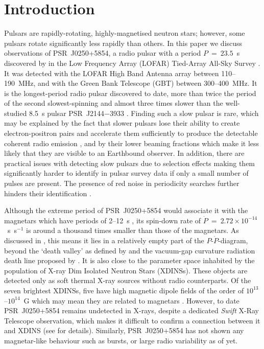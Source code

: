 \section{Introduction}
\label{sec: J0250 - introduction}
Pulsars are rapidly-rotating, highly-magnetised neutron stars; however, some pulsars rotate significantly less rapidly than others. In this paper we discuss observations of PSR~J0250+5854, a radio pulsar with a period $P~=~23.5$~s discovered by \citet{TBC+2018} in the Low Frequency Array (LOFAR) Tied-Array All-Sky Survey \citep[LOTAAS;][]{SCB+2019}. It was detected with the LOFAR High Band Antenna array between 110--190~MHz, and with the Green Bank Telescope (GBT) between 300--400~MHz. It is the longest-period radio pulsar discovered to date, more than twice the period of the second slowest-spinning \citep[PSR~J2251$-$3711 at $P = 12.1$~s;][]{MKE+2020} and almost three times slower than the well-studied 8.5~s pulsar PSR~J2144$-$3933 \citep{YMJx1999}. Finding such a slow pulsar is rare, which may be explained by the fact that slower pulsars lose their ability to create electron-positron pairs and accelerate them sufficiently to produce the detectable coherent radio emission \citep{Sxxx1971}, and by their lower beaming fractions which make it less likely that they are visible to an Earthbound observer. In addition, there are practical issues with detecting slow pulsars due to selection effects making them significantly harder to identify in pulsar survey data if only a small number of pulses are present. The presence of red noise in periodicity searches further hinders their identification \citep[e.g.][]{LBH+2015,HKRx2017}.

Although the extreme period of PSR~J0250+5854 would associate it with the magnetars which have periods of 2--12~s \citep{OKxx2014}, its spin-down rate of $\dot{P}~=~2.72\times10^{-14}$~s~s$^{-1}$ is around a thousand times smaller than those of the magnetars. As discussed in \citet{TBC+2018}, this means it lies in a relatively empty part of the $P$-$\dot{P}$-diagram, beyond the `death valley' as defined by \citet{CRxx1993} and the vacuum-gap curvature radiation death line proposed by \citet{ZHMx2000}. It is also close to the parameter space inhabited by the population of X-ray Dim Isolated Neutron Stars (XDINSs). These objects are detected only as soft thermal X-ray sources without radio counterparts. Of the seven brightest XDINSs, five have high magnetic dipole fields of the order of $10^{13}$--$10^{14}$~G which may mean they are related to magnetars \citep{Hxxx2007,KKxx2007}. However, to date PSR~J0250+5854 remains undetected in X-rays, despite a dedicated \textit{Swift} X-Ray Telescope observation, which makes it difficult to confirm a connection between it and XDINS (see \citealt{TBC+2018} for details). Similarly, PSR~J0250+5854 has not shown any magnetar-like behaviour such as bursts, or large radio variability as of yet.

